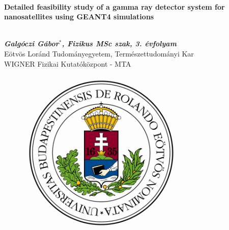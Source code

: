 \documentclass[12pt, a4paper,titlepage]{article}
\numberwithin{equation}{section}
\numberwithin{figure}{section}
\begin{document}
\begin{titlepage}

\begin{center}
\ \\

\vspace{1 cm}
\begin{large}\textbf{Detailed feasibility study of a gamma ray detector system for nanosatellites using GEANT4 simulations}\end{large}\\
\vspace{1 cm}
\textit{\textbf{Galgóczi Gábor$^{*}$, Fizikus MSc szak, 3. évfolyam}}\\
Eötvös Loránd Tudományegyetem, Természettudományi Kar\\
WIGNER Fizikai Kutatóközpont - MTA\\
\vspace{1.5cm}


\begin{figure}[H]
\centering


\includegraphics[width=80.0mm]{images/elte.png}  
\end{figure}






\end{center}
\end{titlepage}
\end{document}

